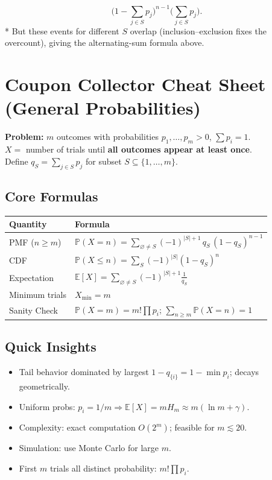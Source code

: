 \documentclass{book}
\begin{document}
  $$
  \Big(1-\sum_{j\in S}p_j\Big)^{n-1}\Big(\sum_{j\in S}p_j\Big).
  $$
* But these events for different $S$ overlap (inclusion–exclusion fixes the overcount), giving the alternating-sum formula above.


\section*{Coupon Collector Cheat Sheet (General Probabilities)}
\textbf{Problem:} $m$ outcomes with probabilities $p_1,\dots,p_m>0$, $\sum p_i=1$.\\
$X =$ number of trials until \textbf{all outcomes appear at least once}.\\
Define $q_S = \sum_{j\in S} p_j$ for subset $S \subseteq \{1,\dots,m\}$.

\subsection*{Core Formulas}
\begin{tabular}{@{}ll@{}}
\toprule
\textbf{Quantity} & \textbf{Formula} \\
\midrule
PMF ($n\ge m$) & $\displaystyle \mathbb P(X=n)=\sum_{\varnothing\neq S}(-1)^{|S|+1}\,q_S\,(1-q_S)^{n-1}$ \\
CDF & $\displaystyle \mathbb P(X\le n)=\sum_{S}(-1)^{|S|}(1-q_S)^n$ \\
Expectation & $\displaystyle \mathbb E[X]=\sum_{\varnothing\neq S}(-1)^{|S|+1}\frac{1}{q_S}$ \\
Minimum trials & $X_{\min}=m$ \\
Sanity Check & $\mathbb P(X=m)=m!\prod p_i$; $\sum_{n\ge m} \mathbb P(X=n)=1$ \\
\bottomrule
\end{tabular}

\subsection*{Quick Insights}
\begin{itemize}
    \item Tail behavior dominated by largest $1-q_{\{i\}} = 1-\min p_i$; decays geometrically.
    \item Uniform probs: $p_i=1/m \Rightarrow \mathbb E[X]=m H_m \approx m(\ln m+\gamma)$.
    \item Complexity: exact computation $O(2^m)$; feasible for $m\lesssim 20$.
    \item Simulation: use Monte Carlo for large $m$.
    \item First $m$ trials all distinct probability: $m!\prod p_i$.
\end{itemize}
\end{document}
